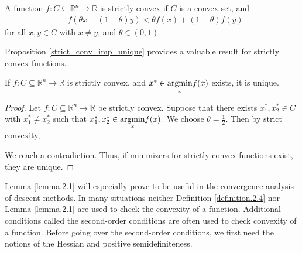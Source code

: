 \begin{definition}\label{strict_convexity}
A function $f: C\subseteq\mathbb{R}^{n} \longrightarrow \mathbb{R}$ is strictly convex if $C$ is a convex set, and
\begin{equation*}\label{eq:strict_conv}\tag{3.2.3}
\begin{aligned}
    &f(\theta x + (1-\theta) y) < \theta f(x) + (1-\theta) f(y)
\end{aligned}
\end{equation*}
for all $x,y \in C$ with $x\neq y$, and $\theta\in (0,1)$.
\end{definition}    
Proposition \ref{strict_conv_imp_unique} provides a valuable result for strictly convex functions.
\begin{proposition}\label{strict_conv_imp_unique}
If $f:C\subseteq\mathbb{R}^{n}\longrightarrow\mathbb{R}$ is strictly convex, and $x^{*}\in\underset{x}{\textnormal{argmin}}f(x)$ exists, it is unique.
\end{proposition}
\begin{proof}
Let $f:C\subseteq\mathbb{R}^{n}\longrightarrow\mathbb{R}$ be strictly convex. Suppose that there exists $x_{1}^{*}, x_{2}^{*}\in C$ with $x_{1}^{*}\neq x_{2}^{*}$ such that $x_{1}^{*}, x_{2}^{*} \in \underset{x}{\textnormal{argmin}}f(x).$ We choose $\theta=\frac{1}{2}.$ Then by strict convexity, 

We reach a contradiction. Thus, if minimizers for strictly convex functions exist, they are unique. 
\end{proof}
Lemma \ref{lemma.2.1} will especially prove to be useful in the convergence analysis of descent methods. In many situations neither Definition \ref{definition.2.4} nor Lemma \ref{lemma.2.1} are used to check the convexity of a function. Additional conditions called the second-order conditions are often used to check convexity of a function. Before going over the second-order conditions, we first need the notions of the Hessian and positive semidefiniteness. 
